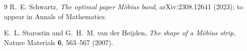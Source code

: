 \documentclass[11pt,a4paper]{article}
\begin{document}
\begin{thebibliography}{9}
R.~E. Schwartz,
\textit{The optimal paper M\"obius band},
arXiv:2308.12641 (2023); to appear in Annals of Mathematics.

E.~L. Starostin and G.~H.~M. van der Heijden,
\textit{The shape of a M\"obius strip},
Nature Materials \textbf{6}, 563--567 (2007).
\end{thebibliography}
\end{document}
